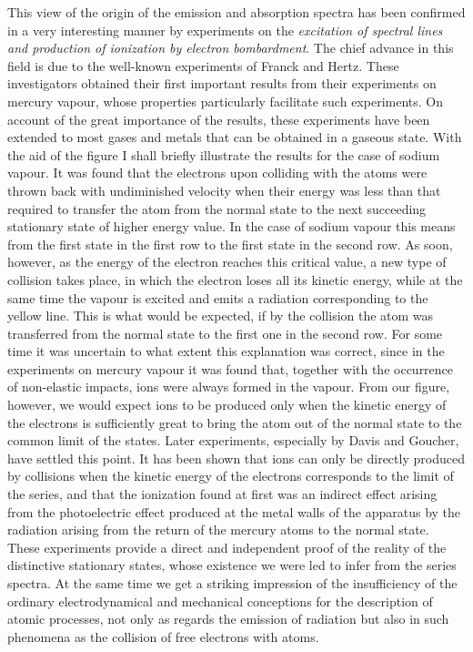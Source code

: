 This view of the origin of the emission and absorption spectra
has been confirmed in a very interesting manner by experiments
on the \emph{excitation of spectral lines and production of ionization by
electron bombardment}. The chief advance in this field is due to the
well-known experiments of Franck and Hertz. These investigators
obtained their first important results from their experiments on
mercury vapour, whose properties particularly facilitate such experiments.
On account of the great importance of the results, these
experiments have been extended to most gases and metals that can
be obtained in a gaseous state. With the aid of the figure I shall
briefly illustrate the results for the case of sodium vapour. It was
found that the electrons upon colliding with the atoms were thrown
back with undiminished velocity when their energy was less than
that required to transfer the atom from the normal state to the
next succeeding stationary state of higher energy value. In the
case of sodium vapour this means from the first state in the first
row to the first state in the second row. As soon, however, as the
energy of the electron reaches this critical value, a new type of
collision takes place, in which the electron loses all its kinetic
energy, while at the same time the vapour is excited and emits a
radiation corresponding to the yellow line. This is what would be
expected, if by the collision the atom was transferred from the
normal state to the first one in the second row. For some time it
was uncertain to what extent this explanation was correct, since
in the experiments on mercury vapour it was found that, together
with the occurrence of non-elastic impacts, ions were always formed
in the vapour. From our figure, however, we would expect ions
to be produced only when the kinetic energy of the electrons is
sufficiently great to bring the atom out of the normal state to the
common limit of the states. Later experiments, especially by Davis
and Goucher, have settled this point. It has been shown that ions
can only be directly produced by collisions when the kinetic energy
of the electrons corresponds to the limit of the series, and that the
ionization found at first was an indirect effect arising from the
photoelectric effect produced at the metal walls of the apparatus
by the radiation arising from the return of the mercury atoms to
the normal state. These experiments provide a direct and independent
proof of the reality of the distinctive stationary states,
whose existence we were led to infer from the series spectra. At
the same time we get a striking impression of the insufficiency of
the ordinary electrodynamical and mechanical conceptions for the
description of atomic processes, not only as regards the emission
of radiation but also in such phenomena as the collision of free
electrons with atoms.


